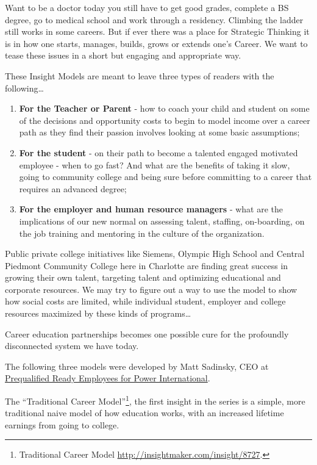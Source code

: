 \documentclass[]{memoir}
\begin{document}
Want to be a doctor today you still have to get good grades, complete a
BS degree, go to medical school and work through a residency. Climbing
the ladder still works in some careers. But if ever there was a place
for Strategic Thinking it is in how one starts, manages, builds, grows
or extends one's Career. We want to tease these issues in a short but
engaging and appropriate way.

These Insight Models are meant to leave three types of readers with the
following\ldots{}

\begin{enumerate}
\def\labelenumi{\arabic{enumi}.}
\itemsep1pt\parskip0pt
\item
  \textbf{For the Teacher or Parent} - how to coach your child and
  student on some of the decisions and opportunity costs to begin to
  model income over a career path as they find their passion involves
  looking at some basic assumptions;
\item
  \textbf{For the student} - on their path to become a talented engaged
  motivated employee - when to go fast? And what are the benefits of
  taking it slow, going to community college and being sure before
  committing to a career that requires an advanced degree;
\item
  \textbf{For the employer and human resource managers} - what are the
  implications of our new normal on assessing talent, staffing,
  on-boarding, on the job training and mentoring in the culture of the
  organization.
\end{enumerate}

Public private college initiatives like Siemens, Olympic High School and
Central Piedmont Community College here in Charlotte are finding great
success in growing their own talent, targeting talent and optimizing
educational and corporate resources. We may try to figure out a way to
use the model to show how social costs are limited, while individual
student, employer and college resources maximized by these kinds of
programs\ldots{}

Career education partnerships becomes one possible cure for the
profoundly disconnected system we have today.

The following three models were developed by Matt Sadinsky, CEO at
\href{http://www.prepintl.com/}{Prequalified Ready Employees for Power
International}.

The ``Traditional Career Model''\footnote{Traditional Career Model
  \url{http://insightmaker.com/insight/8727}.}, the first insight in the
series is a simple, more traditional naive model of how education works,
with an increased lifetime earnings from going to college.
\end{document}
